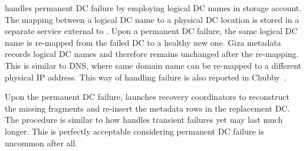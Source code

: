 %

\name handles permanent DC failure by employing logical DC names in storage account. The mapping between a logical DC name to a physical DC location is stored in a separate service external to \name. Upon a permanent DC failure, the same logical DC name is re-mapped from the failed DC to a healthy new one. Giza metadata records logical DC names and therefore remains unchanged after the re-mapping. This is similar to DNS, where same domain name can be re-mapped to a different physical IP address. This way of handling failure is also reported in Chubby~\cite{chubby:osdi06}.

Upon the permanent DC failure, \name launches recovery coordinators to reconstruct the missing fragments and re-insert the metadata rows in the replacement DC. The procedure is similar to how \name handles transient failures yet may last much longer. This is perfectly acceptable considering permanent DC failure is uncommon after all.



